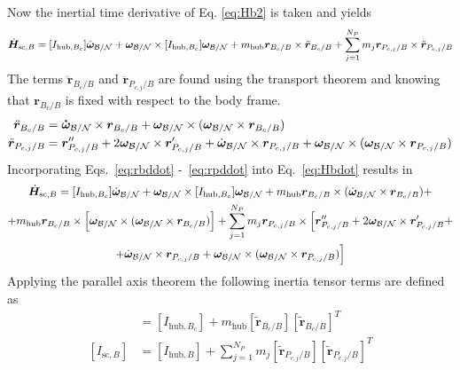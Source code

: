 \documentclass[]{BasiliskReportMemo}
\begin{document}
	Now the inertial time derivative of Eq. \eqref{eq:Hb2} is taken and yields
	\begin{equation}
	\dot{\bm{H}}_{\text{sc},B} = [I_{\text{hub},B_c}] \dot{\bm\omega}_{\cal B/N} + \bm\omega_{\cal B/N} \times [I_{\text{hub},B_c}] \bm\omega_{\cal B/N} + m_{\text{hub}} \bm{r}_{B_c/B}\times\ddot{\bm r}_{B_c/B}+ \sum\limits_{j=1}^{N_P}m_j \bm r_{P_{c,j}/B}\times \ddot{\bm r}_{P_{c,j}/B}
	\label{eq:Hbdot}
	\end{equation}
	The terms $\ddot{\bm r}_{B_c/B}$ and $\ddot{\bm r}_{P_{c,j}/B}$ are found using the transport theorem and knowing that $\bm{r}_{B_c/B}$ is fixed with respect to the body frame.
	\begin{align}
	\ddot{\bm r}_{B_c/B} &= \bm{\dot{\omega}}_{\cal B/N} \times \bm{r}_{B_c/B} + \bm\omega_{\cal B/N} \times (\bm\omega_{\cal B/N} \times \bm{r}_{B_c/B})
	\label{eq:rbddot}
    \\
	\ddot{\bm{r}}_{P_{c,j}/B}  &= \bm{r}''_{P_{c,j}/B} +2 \bm\omega_{\cal B/N} \times \bm{r}'_{P_{c,j}/B} + \dot{\bm\omega}_{\cal B/N} \times \bm{r}_{P_{c,j}/B}  +\bm\omega_{\cal B/N} \times (\bm\omega_{\cal B/N} \times \bm{r}_{P_{c,j}/B})
	\label{eq:rpddot}
	\end{align}
	Incorporating Eqs.~\eqref{eq:rbddot} -~\eqref{eq:rpddot} into Eq.~\eqref{eq:Hbdot} results in
	\begin{multline}
	\dot{\bm{H}}_{\text{sc},B} = [I_{\text{hub},B_c}] \dot{\bm\omega}_{\cal B/N} + \bm\omega_{\cal B/N} \times [I_{\text{hub},B_c}] \bm\omega_{\cal B/N} + m_{\text{hub}} \bm{r}_{B_c/B}\times ( \dot{\bm\omega}_{\cal B/N}\times \bm{r}_{B_c/B})+\\ +m_{\text{hub}} \bm{r}_{B_c/B}\times \Bigl[ \bm\omega_{\cal B/N}\times (\bm\omega_{\cal B/N}\times \bm{r}_{B_c/B})\Bigr] + \sum\limits_{j=1}^{N_P}m_j \bm r_{P_{c,j}/B}\times \Bigl[\bm{r}''_{P_{c,j}/B} +2 \bm\omega_{\cal B/N} \times \bm{r}'_{P_{c,j}/B} + \\ + \dot{\bm\omega}_{\cal B/N} \times \bm{r}_{P_{c,j}/B} +\bm\omega_{\cal B/N} \times (\bm\omega_{\cal B/N} \times \bm{r}_{P_{c,j}/B})\Bigr]
	\label{eq:Hbdot2}
	\end{multline}
	Applying the parallel axis theorem the following inertia tensor terms are defined as
	\begin{align}
	[I_{\text{hub},B}] &= [I_{\text{hub},B_c}] + m_{\text{hub}}[\bm{\tilde{r}}_{B_c/B}] [\bm{\tilde{r}}_{B_c/B}]^T
	\\
	[I_{\text{sc},B}] &= [I_{\text{hub},B}] + \sum\limits_{j=1}^{N_P} m_j [\tilde{\bm{r}}_{P_{c,j}/B}] [\tilde{\bm{r}}_{P_{c,j}/B}]^T
	\label{eq:IscB}
	\end{align}
\end{document}
